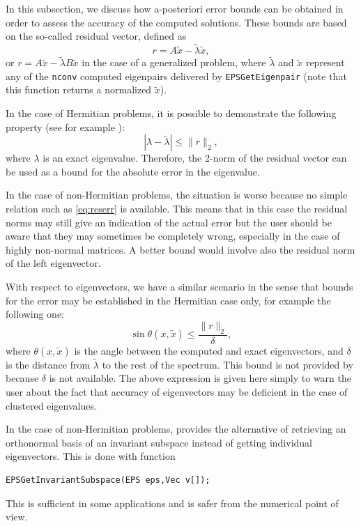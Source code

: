 	In this subsection, we discuss how a-posteriori error bounds can be obtained in order to assess the accuracy of the computed solutions. These bounds are based on the so-called residual vector, defined as
\begin{equation}
r=A\tilde{x}-\tilde{\lambda}\tilde{x},
\end{equation}
or $r=A\tilde{x}-\tilde{\lambda}B\tilde{x}$ in the case of a generalized problem, where $\tilde{\lambda}$ and $\tilde{x}$ represent any of the \texttt{nconv} computed eigenpairs delivered by \texttt{EPSGetEigenpair} (note that this function returns a normalized $\tilde{x}$).

	In the case of Hermitian problems, it is possible to demonstrate the following property (see for example \citep[ch. 3]{Saad:1992:NML}):
\begin{equation}\label{eq:reserr}
|\lambda-\tilde{\lambda}|\leq \|r\|_2,
\end{equation}
where $\lambda$ is an exact eigenvalue. Therefore, the 2-norm of the residual vector can be used as a bound for the absolute error in the eigenvalue.

	In the case of non-Hermitian problems, the situation is worse because no simple relation such as \eqref{eq:reserr} is available. This means that in this case the residual norms may still give an indication of the actual error but the user should be aware that they may sometimes be completely wrong, especially in the case of highly non-normal matrices. A better bound would involve also the residual norm of the left eigenvector.

	With respect to eigenvectors, we have a similar scenario in the sense that bounds for the error may be established in the Hermitian case only, for example the following one:
\begin{equation}
\sin \theta(x,\tilde{x})\leq \frac{\|r\|_2}{\delta},
\end{equation}
where $\theta(x,\tilde{x})$ is the angle between the computed and exact eigenvectors, and $\delta$ is the distance from $\tilde{\lambda}$ to the rest of the spectrum. This bound is not provided by \slepc because $\delta$ is not available. The above expression is given here simply to warn the user about the fact that accuracy of eigenvectors may be deficient in the case of clustered eigenvalues.

	In the case of non-Hermitian problems, \slepc provides the alternative of retrieving an orthonormal basis of an invariant subspace instead of getting individual eigenvectors. This is done with function
	\begin{Verbatim}[fontsize=\small]
	EPSGetInvariantSubspace(EPS eps,Vec v[]);
	\end{Verbatim}
This is sufficient in some applications and is safer from the numerical point of view.

